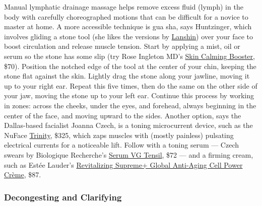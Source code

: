 Manual lymphatic drainage massage helps remove excess fluid (lymph) in
the body with carefully choreographed motions that can be difficult for
a novice to master at home. A more accessible technique is gua sha, says
Huntzinger, which involves gliding a stone tool (she likes the versions
by \href{https://shop.lanshin.com/collections/gua-sha-tools-1}{Lanshin})
over your face to boost circulation and release muscle tension. Start by
applying a mist, oil or serum so the stone has some slip (try Rose
Ingleton MD's
\href{https://www.rosemdskin.com/collections/frontpage/products/rose-skin-calming-booster}{Skin
Calming Booster}, \$70). Position the notched edge of the tool at the
center of your chin, keeping the stone flat against the skin. Lightly
drag the stone along your jawline, moving it up to your right ear.
Repeat this five times, then do the same on the other side of your jaw,
moving the stone up to your left ear. Continue this process by working
in zones: across the cheeks, under the eyes, and forehead, always
beginning in the center of the face, and moving upward to the sides.
Another option, says the Dallas-based facialist Joanna Czech, is a
toning microcurrent device, such as the NuFace
\href{https://www.joannaczech.com/products/nuface-trinity-facial-toning-device?_pos=3\&_sid=88913c290\&_ss=r}{Trinity},
\$325, which zaps muscles with (mostly painless) pulsating electrical
currents for a noticeable lift. Follow with a toning serum --- Czech
swears by Biologique Recherche's
\href{https://www.joannaczech.com/products/serum-vg-tensil}{Serum VG
Tensil}, \$72 --- and a firming cream, such as Estée Lauder's
\href{https://www.esteelauder.com/product/681/42475/product-catalog/skincare/revitalizing-supreme/global-anti-aging-cell-power-creme}{Revitalizing
Supreme+ Global Anti-Aging Cell Power Crème}, \$87.

\hypertarget{decongesting-and-clarifying}{%
\subsubsection{\texorpdfstring{\textbf{Decongesting and
Clarifying}}{Decongesting and Clarifying}}\label{decongesting-and-clarifying}}

